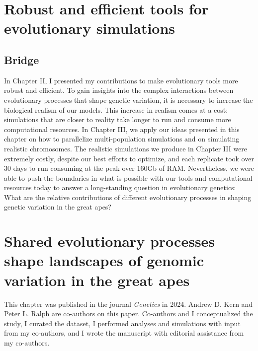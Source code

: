 







\chapter{Robust and efficient tools for evolutionary simulations} \label{chapter:tools}



\newpage
\section{Bridge}

In Chapter II, I presented my contributions to make evolutionary tools more robust and efficient.
To gain insights into the complex interactions between evolutionary processes that shape genetic variation, 
it is necessary to increase the biological realism of our models.
This increase in realism comes at a cost: simulations that are closer to reality take longer to run and consume more computational resources.
In Chapter III, we apply our ideas presented in this chapter on how to parallelize multi-population simulations and on simulating realistic chromosomes.
The realistic simulations we produce in Chapter III were extremely costly, despite our best efforts to optimize, and each replicate took over 30 days to run consuming at the peak over 160Gb of RAM.
Nevertheless, we were able to push the boundaries in what is possible with our tools and computational resources today to answer a long-standing question in evolutionary genetics: What are the relative contributions of different evolutionary processes in shaping genetic variation in the great apes?

\chapter{Shared evolutionary processes shape landscapes of genomic variation in the great apes} \label{chapter:greatapes}

\bigskip
This chapter was published in the journal \emph{Genetics} in 2024. 
Andrew D. Kern and Peter L. Ralph are co-authors on this paper.
Co-authors and I conceptualized the study,
I curated the dataset,
I performed analyses and simulations with input from my co-authors, and
I wrote the manuscript with editorial assistance from my co-authors.

